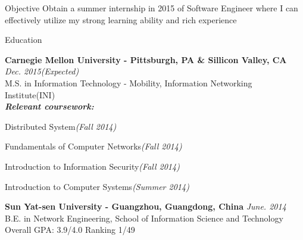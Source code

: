 \documentclass{resume} %
\begin{document}
\begin{rSection}{Objective}
Obtain a summer internship in 2015 of Software Engineer where I can effectively utilize my strong learning ability and rich experience 

\end{rSection}


\begin{rSection}{Education}

{\bf Carnegie Mellon University - Pittsburgh, PA \& Sillicon Valley, CA} \hfill {\em Dec. 2015(Expected)} \\ 
M.S. in Information Technology - Mobility, Information Networking Institute(INI) \\
{\bf\em Relevant coursework:}
\begin{inparaenum}[\itshape 1\upshape)]
\item Distributed System{\em(Fall 2014)}
\item Fundamentals of Computer Networks{\em(Fall 2014)}
\item Introduction to Information Security{\em(Fall 2014)}
\item Introduction to Computer Systems{\em(Summer 2014)}
\end{inparaenum}


{\bf Sun Yat-sen University - Guangzhou, Guangdong, China} \hfill {\em June. 2014} \\ 
B.E. in Network Engineering, 
School of Information Science and Technology \\
Overall GPA: 3.9/4.0 Ranking 1/49

\end{rSection}


\end{document}

